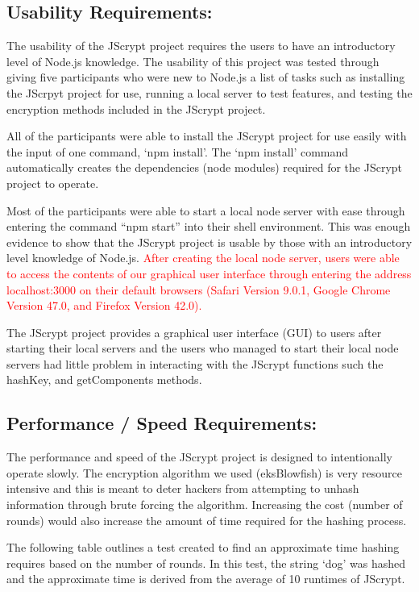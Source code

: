 \documentclass[12pt]{article}
\begin{document}
\subsection{Usability Requirements:}
The usability of the JScrypt project requires the users to have an introductory level of Node.js knowledge. The usability of this project was tested through giving five participants who were new to Node.js a list of tasks such as installing the JScrpyt project for use, running a local server to test features, and testing the encryption methods included in the JScrypt project.

All of the participants were able to install the JScrypt project for use easily with the input of one command, `npm install'. The `npm install' command automatically creates the dependencies (node modules) required for the JScrypt project to operate.

Most of the participants were able to start a local node server with ease through entering the command “npm start” into their shell environment. This was enough evidence to show that the JScrypt project is usable by those with an introductory level knowledge of Node.js. \textcolor{red}{After creating the local node server, users were able to access the contents of our graphical user interface through entering the address localhost:3000 on their default browsers (Safari Version 9.0.1, Google Chrome Version 47.0, and Firefox Version 42.0).}

The JScrypt project provides a graphical user interface (GUI) to users after starting their local servers and the users who managed to start their local node servers had little problem in interacting with the JScrypt functions such the hashKey, and getComponents methods.

\subsection{Performance / Speed Requirements:}
The performance and speed of the JScrypt project is designed to intentionally operate slowly. The encryption algorithm we used (eksBlowfish) is very resource intensive and this is meant to deter hackers from attempting to unhash information through brute forcing the algorithm. Increasing the cost (number of rounds) would also increase the amount of time required for the hashing process.

The following table outlines a test created to find an approximate time hashing requires based on the number of rounds. In this test, the string `dog' was hashed and the approximate time is derived from the average of 10 runtimes of JScrypt.
\end{document}
